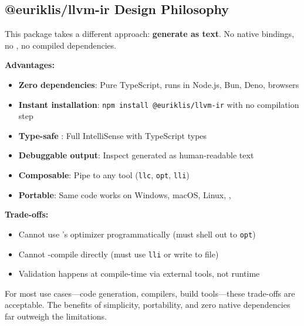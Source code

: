 \subsection{@euriklis/llvm-ir Design Philosophy}

This package takes a different approach: \textbf{generate   as text}. No native bindings, no , no compiled dependencies.

\textbf{Advantages:}
\begin{itemize}[noitemsep]
  \item \textbf{Zero dependencies}: Pure TypeScript, runs in Node.js, Bun, Deno, browsers
  \item \textbf{Instant installation}: \texttt{npm install @euriklis/llvm-ir} with no compilation step
  \item \textbf{Type-safe }: Full IntelliSense with TypeScript types
  \item \textbf{Debuggable output}: Inspect generated  as human-readable text
  \item \textbf{Composable}: Pipe  to any  tool (\texttt{llc}, \texttt{opt}, \texttt{lli})
  \item \textbf{Portable}: Same code works on Windows, macOS, Linux, , 
\end{itemize}

\textbf{Trade-offs:}
\begin{itemize}[noitemsep]
  \item Cannot use 's optimizer programmatically (must shell out to \texttt{opt})
  \item Cannot -compile directly (must use \texttt{lli} or write  to file)
  \item Validation happens at compile-time via external tools, not runtime
\end{itemize}

For most use cases—code generation,  compilers, build tools—these trade-offs are acceptable. The benefits of simplicity, portability, and zero native dependencies far outweigh the limitations.
